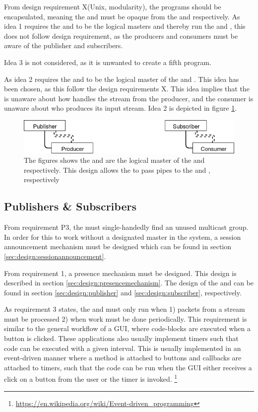 From design requirement X(Unix, modularity), the programs should be encapsulated, meaning the \pubs{} and \subs{} must be opaque from the \cons{} and \pros{} respectively. As idea 1 requires the \cons{} and \pros{} to be the logical masters and thereby run the \pubs{} and \subs{}, this does not follow design requirement, as the producers and consumers must be aware of the publisher and subscribers.

Idea 3 is not considered, as it is unwanted to create a fifth program.

As idea 2 requires the \pubs{} and \subs{} to be the logical master of the \cons{} and \pros{}. This idea has been chosen, as this follow the design requirements X. This idea implies that the \pro{} is unaware about how handles the stream from the producer, and the consumer is unaware about who produces its input stream.  Idea 2 is depicted in figure \ref{fig:design:pubsub:runmode_master}.

\begin{figure}[H]
	\centering
	\includegraphics[width=1\textwidth]{figures/runmode_master}
	\caption{The figures shows the \pub{} and \sub{} are the logical master of the \pro{} and \con{} respectively. This design allows the \pubs{} to pass pipes to the \pro{} and \con{}, respectively} \label{fig:design:pubsub:runmode_master}
\end{figure}

\subsection{Publishers \& Subscribers}
From requirement P3, the \pub{} must single-handedly find an unused multicast group. In order for this to work without a designated master in the system, a session announcement mechanism must be designed which can be found in section \ref{sec:design:sessionannouncement}.


\noindent From requirement 1, a presence mechanism must be designed. This design is described in section \ref{sec:design:presencemechanism}. The design of the \pubs{} and \subs{} can be found in section \ref{sec:design:publisher} and \ref{sec:design:subscriber}, respectively.

As requirement 3 states, the \pubs{} and \subs{} must only run when 1) packets from a stream must be processed  2) when work must be done periodically. This requirement is similar to the general workflow of a \ac{GUI}, where code-blocks are executed when a button is clicked. These applications also usually implement timers such that code can be executed with a given interval. This is usually implemented in an event-driven manner where a method is attached to buttons and callbacks are attached to timers, such that the code can be run when the GUI either receives a click on a button from the user or the timer is invoked. \footnote{\url{https://en.wikipedia.org/wiki/Event-driven_programming}}

